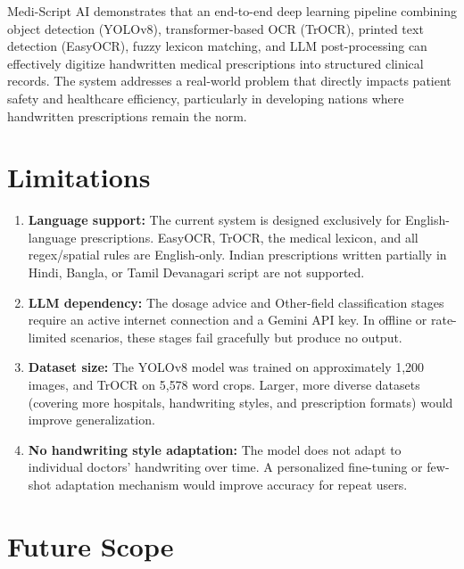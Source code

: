 \documentclass[12pt,a4paper,oneside]{report}
\begin{document}
Medi-Script AI demonstrates that an end-to-end deep learning pipeline combining object detection (YOLOv8), transformer-based OCR (TrOCR), printed text detection (EasyOCR), fuzzy lexicon matching, and LLM post-processing can effectively digitize handwritten medical prescriptions into structured clinical records. The system addresses a real-world problem that directly impacts patient safety and healthcare efficiency, particularly in developing nations where handwritten prescriptions remain the norm.

\section{Limitations}

\begin{enumerate}
  \item \textbf{Language support:} The current system is designed exclusively for English-language prescriptions. EasyOCR, TrOCR, the medical lexicon, and all regex/spatial rules are English-only. Indian prescriptions written partially in Hindi, Bangla, or Tamil Devanagari script are not supported.

  \item \textbf{LLM dependency:} The dosage advice and Other-field classification stages require an active internet connection and a Gemini API key. In offline or rate-limited scenarios, these stages fail gracefully but produce no output.

  \item \textbf{Dataset size:} The YOLOv8 model was trained on approximately 1{,}200 images, and TrOCR on 5{,}578 word crops. Larger, more diverse datasets (covering more hospitals, handwriting styles, and prescription formats) would improve generalization.

  \item \textbf{No handwriting style adaptation:} The model does not adapt to individual doctors' handwriting over time. A personalized fine-tuning or few-shot adaptation mechanism would improve accuracy for repeat users.
\end{enumerate}

\section{Future Scope}
\end{document}
